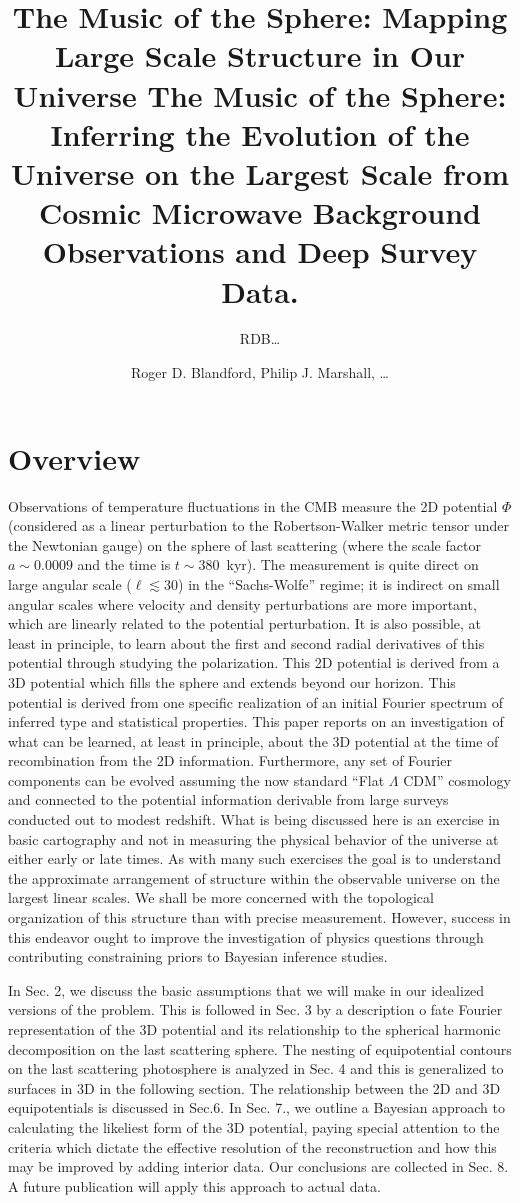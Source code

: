 \documentclass[12pt]{article}
\title{The Music of the Sphere: Mapping Large Scale Structure in Our Universe }
\author{RDB\dots}
\title{The Music of the Sphere: Inferring the Evolution of the Universe on the Largest Scale from Cosmic Microwave Background Observations and Deep Survey Data.}
\author{Roger D. Blandford, Philip J. Marshall, \dots}
\begin{document}
\maketitle

\section{Overview}
Observations of temperature fluctuations in the CMB measure the 2D potential $\Phi$ (considered as a linear perturbation to the Robertson-Walker metric tensor under the Newtonian gauge) on the sphere of last scattering (where the scale factor $a\sim0.0009$ and the time is $t\sim380$~kyr). The measurement is quite direct on large angular scale ($\ell\lesssim30$) in the ``Sachs-Wolfe'' regime; it is indirect on small angular scales where velocity and density perturbations are more important, which are linearly related to the potential perturbation. It is also possible, at least in principle, to learn about the first and second radial derivatives of this potential through studying the polarization. This 2D potential is derived from a 3D potential which fills the sphere and extends beyond our horizon. This potential is derived from one specific realization of an initial Fourier spectrum of inferred type and statistical properties.  This paper reports on an investigation of what can be learned, at least in principle, about the 3D potential at the time of recombination from the 2D information. Furthermore, any set of Fourier components can be evolved assuming the now standard ``Flat $\Lambda$ CDM'' cosmology and connected to the potential information derivable from large surveys conducted out to modest redshift. What is being discussed here is an exercise in basic cartography and not in measuring the physical behavior of the universe at either early or late times. As with many such exercises the goal is to understand the approximate arrangement of structure within the observable universe on the largest linear scales. We shall be more concerned with the topological organization of this structure than with precise measurement. However, success in this endeavor ought to improve the investigation of physics questions through contributing constraining priors to Bayesian inference studies.

In Sec. 2, we discuss the basic assumptions that we will make in our idealized versions of the problem. This is followed in Sec. 3 by a description o fate Fourier representation of the 3D potential and its relationship to the spherical harmonic decomposition on the last scattering sphere. The nesting of equipotential contours on the last scattering photosphere is analyzed in Sec. 4 and this is generalized to surfaces in 3D in the following section.  The relationship between the 2D and 3D equipotentials is discussed in Sec.6. In Sec. 7., we outline a Bayesian approach to calculating the likeliest form of the 3D potential, paying special attention to the criteria which dictate the effective resolution of the reconstruction and how this may be improved by adding interior data. Our conclusions are collected in Sec. 8. A future publication will apply this approach to actual data.
\end{document}
